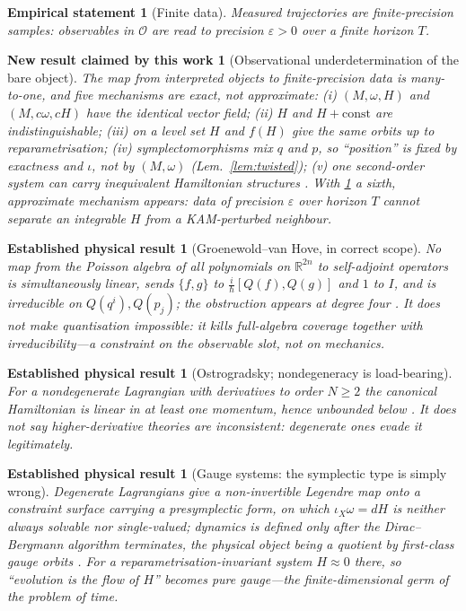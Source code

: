 \documentclass[12pt,a4paper]{article}
\theoremstyle{definition}
\theoremstyle{plain}
\theoremstyle{commentary}
\newtheorem{empirical}[definition]{Empirical statement}
\newtheorem{established}[definition]{Established physical result}
\newtheorem{newresult}[definition]{New result claimed by this work}
\newcommand{\R}{\mathbb{R}}
\newcommand{\Oc}{\mathcal{O}}
\newcommand{\eps}{\varepsilon}
\newcommand{\pb}[2]{\{#1,#2\}}
\begin{document}
\begin{empirical}[Finite data]\label{emp:finite}
Measured trajectories are finite-precision samples: observables in $\Oc$ are read to precision
$\eps>0$ over a finite horizon $T$.
\end{empirical}

\begin{newresult}[Observational underdetermination of the bare object]\label{new:underdet}
The map from interpreted objects to finite-precision data is many-to-one, and five mechanisms are
exact, not approximate: (i) $(M,\omega,H)$ and $(M,c\omega,cH)$ have the \emph{identical} vector
field; (ii) $H$ and $H+\mathrm{const}$ are indistinguishable; (iii) on a level set $H$ and $f(H)$
give the same orbits up to reparametrisation; (iv) symplectomorphisms mix $q$ and $p$, so
``position'' is fixed by exactness and $\iota$, not by $(M,\omega)$ (Lem.~\ref{lem:twisted});
(v) one second-order system can carry inequivalent Hamiltonian structures
\cite{Douglas1941,Santilli1978}. With \ref{emp:finite} a sixth, approximate mechanism appears: data
of precision $\eps$ over horizon $T$ cannot separate an integrable $H$ from a KAM-perturbed
neighbour.
\end{newresult}

\begin{established}[Groenewold--van Hove, in correct scope]\label{est:gvh}
No map from the Poisson algebra of \emph{all} polynomials on $\R^{2n}$ to self-adjoint operators is
simultaneously linear, sends $\pb{f}{g}$ to $\tfrac{i}{\hbar}[Q(f),Q(g)]$ and $1$ to $I$, and is
irreducible on $Q(q^i),Q(p_j)$; the obstruction appears at degree four
\cite{Groenewold1946,vanHove1951}. It does \emph{not} make quantisation impossible: it
kills full-algebra coverage \emph{together with} irreducibility---a constraint on the observable
slot, not on mechanics.
\end{established}

\begin{established}[Ostrogradsky; nondegeneracy is load-bearing]\label{est:ostro}
For a \emph{nondegenerate} Lagrangian with derivatives to order $N\ge2$ the canonical Hamiltonian is
linear in at least one momentum, hence unbounded below \cite{Woodard2015}. It does \emph{not} say
higher-derivative theories are inconsistent: degenerate ones evade it legitimately.
\end{established}

\begin{established}[Gauge systems: the symplectic type is simply wrong]\label{est:gauge}
Degenerate Lagrangians give a non-invertible Legendre map onto a constraint surface carrying a
presymplectic form, on which $\iota_X\omega=dH$ is neither always solvable nor single-valued;
dynamics is defined only after the Dirac--Bergmann algorithm terminates, the physical object being
a quotient by first-class gauge orbits \cite{Dirac1964}.
For a reparametrisation-invariant system $H\approx0$ there, so ``evolution is the flow of $H$''
becomes pure gauge---the finite-dimensional germ of the problem of time.
\end{established}
\end{document}
